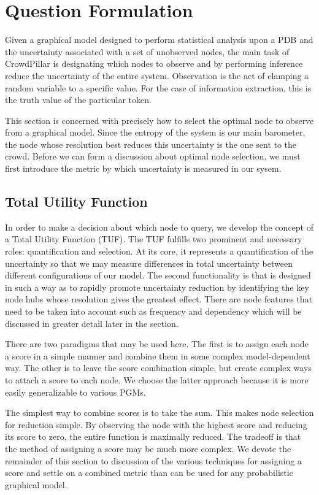 \section{Question Formulation}
Given a graphical model designed to perform statistical analysis upon a PDB and the uncertainty associated with a set of unobserved nodes, the main task of CrowdPillar is designating which nodes to observe and by performing inference reduce the uncertainty of the entire system.  Observation is the act of clamping a random variable to a specific value.  For the case of information extraction, this is the truth value of the particular token.

This section is concerned with precisely how to select the optimal node to observe from a graphical model.  Since the entropy of the system is our main barometer, the node whose resolution best reduces this uncertainty is the one sent to the crowd.  Before we can form a discussion about optimal node selection, we must first introduce the metric by which uncertainty is measured in our sysem.


\subsection{Total Utility Function}
In order to make a decision about which node to query, we develop the concept of a Total Utility Function (TUF). The TUF fulfills two prominent and necessary roles: quantification and selection.  At its core, it represents a quantification of the uncertainty so that we may measure differences in total uncertainty between different configurations of our model.  The second functionality is that is designed in such a way as to rapidly promote uncertainty reduction by identifying the key node hubs whose resolution gives the greatest effect.  There are node features that need to be taken into account such as frequency and dependency which will be discussed in greater detail later in the section. 

There are two paradigms that may be used here.  The first is to assign each node a score in a simple manner and combine them in some complex model-dependent way.  The other is to leave the score combination simple. but create complex ways to attach a score to each node.  We choose the latter approach because it is more easily generalizable to various PGMs.

The simplest way to combine scores is to take the sum.  This makes node selection for reduction simple.  By observing the node with the highest score and reducing its score to zero, the entire function is maximally reduced.  The tradeoff is that the method of assigning a score may be much more complex.  We devote the remainder of this section to discussion of the various techniques for assigning a score and settle on a combined metric than can be used for any probabilistic graphical model.

